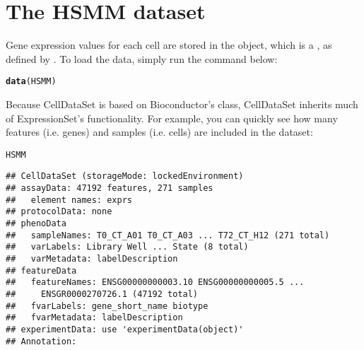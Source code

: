 \documentclass[10pt,oneside]{article}\usepackage[]{graphicx}\usepackage[]{color}
\makeatletter
\newcommand{\hlstd}[1]{\textcolor[rgb]{0.345,0.345,0.345}{#1}}%
\newcommand{\hlkwd}[1]{\textcolor[rgb]{0.737,0.353,0.396}{\textbf{#1}}}%
\newenvironment{kframe}{%
 \def\at@end@of@kframe{}%
 \ifinner\ifhmode%
  \def\at@end@of@kframe{\end{minipage}}%
  \begin{minipage}{\columnwidth}%
 \fi\fi%
 \def\FrameCommand##1{\hskip\@totalleftmargin \hskip-\fboxsep
 \colorbox{shadecolor}{##1}\hskip-\fboxsep
     \hskip-\linewidth \hskip-\@totalleftmargin \hskip\columnwidth}%
 \MakeFramed {\advance\hsize-\width
   \@totalleftmargin\z@ \linewidth\hsize
   \@setminipage}}%
 {\par\unskip\endMakeFramed%
 \at@end@of@kframe}
\newenvironment{knitrout}{}{} %
\makeatother
\begin{document}
\section{The HSMM dataset}
Gene expression values for each cell are stored in the  object, which is a , as defined by . To load the data, simply run the command below:
\begin{knitrout}
\color{fgcolor}\begin{kframe}
\begin{alltt}
\hlkwd{data}\hlstd{(HSMM)}
\end{alltt}
\end{kframe}
\end{knitrout}


Because CellDataSet is based on Bioconductor's  class, CellDataSet inherits much of ExpressionSet's functionality.  For example, you can quickly see how many features (i.e. genes) and samples (i.e. cells) are included in the dataset:
\begin{knitrout}
\color{fgcolor}\begin{kframe}
\begin{alltt}
\hlstd{HSMM}
\end{alltt}
\begin{verbatim}
## CellDataSet (storageMode: lockedEnvironment)
## assayData: 47192 features, 271 samples 
##   element names: exprs 
## protocolData: none
## phenoData
##   sampleNames: T0_CT_A01 T0_CT_A03 ... T72_CT_H12 (271 total)
##   varLabels: Library Well ... State (8 total)
##   varMetadata: labelDescription
## featureData
##   featureNames: ENSG00000000003.10 ENSG00000000005.5 ...
##     ENSGR0000270726.1 (47192 total)
##   fvarLabels: gene_short_name biotype
##   fvarMetadata: labelDescription
## experimentData: use 'experimentData(object)'
## Annotation:
\end{verbatim}
\end{kframe}
\end{knitrout}
\end{document}
